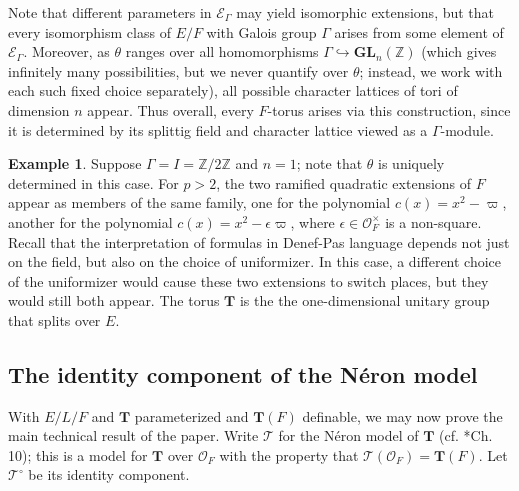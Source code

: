 \documentclass{amsart}
\newcommand{\Z}{{\mathbb Z}}
\newcommand{\ri}{\mathcal{O}}
\newcommand{\GL}{\mathbf {GL}}
\newcommand{\bT}{\mathbf {T}}
\newcommand\cE{{\mathcal E}}
\newcommand{\Ner}[1]{\mathcal{#1}}
\newcommand{\NerC}[1]{\mathcal{#1}^\circ}
\theoremstyle{plain}
\theoremstyle{definition}
\newtheorem{rem}[thm]{Remark}
\newtheorem{example}[thm]{Example}
\begin{document}
Note that different parameters in $\cE_\Gamma$ may yield isomorphic extensions, but that every isomorphism class of $E/F$ with Galois group $\Gamma$
arises from some element of $\cE_\Gamma$.  Moreover, as $\theta$ ranges over all homomorphisms $\Gamma \hookrightarrow \GL_n(\Z)$ (which gives infinitely many possibilities, but we never quantify over $\theta$; instead, we work with each such fixed choice separately),  all possible character lattices of tori of dimension $n$ appear. Thus overall, every $F$-torus arises via this construction, since it is determined by its splittig field and character lattice viewed as a $\Gamma$-module. 
\begin{example}
Suppose $\Gamma = I = \Z / 2\Z$ and $n=1$; note that $\theta$ is uniquely determined in this case.
For $p > 2$, the two ramified quadratic extensions of $F$ appear as members of the same family,
one for the polynomial $c(x) = x^2-\varpi$, another for the polynomial $c(x) = x^2-\epsilon\varpi$,
where $\epsilon \in \ri_F^\times$ is a non-square.
Recall that the interpretation of formulas in Denef-Pas language depends not just on the field,
but also on the choice of uniformizer. In this case, a different choice of the uniformizer
would cause these two extensions to switch places, but they would still both appear.
The torus $\bT$ is the the one-dimensional unitary group that splits over $E$.
\end{example}

\subsection{The identity component of the N\'eron model} \label{sub:NerCdefinable}

With $E/L/F$ and $\bT$ parameterized and $\bT(F)$ definable, we may now prove the main technical result of the paper.
Write $\Ner{T}$ for the N\'eron model of $\bT$ (cf. \cite{bosch-lutkebohmert-raynaud:neron}*{Ch. 10}); this is a model for $\bT$ over $\ri_F$ with the property that $\Ner{T}(\ri_F) = \bT(F)$.  Let $\NerC{T}$ be its identity component.
\end{document}
